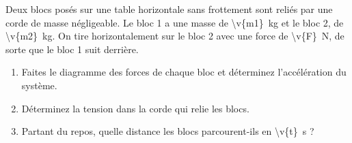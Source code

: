 Deux blocs posés sur une table horizontale sans frottement sont reliés par une corde de masse négligeable. Le bloc 1 a une masse de \qty{\v{m1}}{kg} et le bloc 2, de \qty{\v{m2}}{kg}. On tire horizontalement sur le bloc 2 avec une force de \qty{\v{F}}{N}, de sorte que le bloc 1 suit derrière.

\begin{center}
\end{center}

\begin{enumerate}[label=\alph*)]
    \item Faites le diagramme des forces de chaque bloc et déterminez l'accélération du système.
    \item Déterminez la tension dans la corde qui relie les blocs.
    \item Partant du repos, quelle distance les blocs parcourent-ils en \qty{\v{t}}{s} ?
\end{enumerate}
